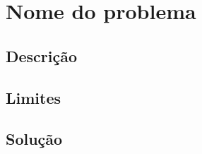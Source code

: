 \section*{Nome do problema}

% 

\subsection*{Descrição}

\subsection*{Limites}

\subsection*{Solução}
